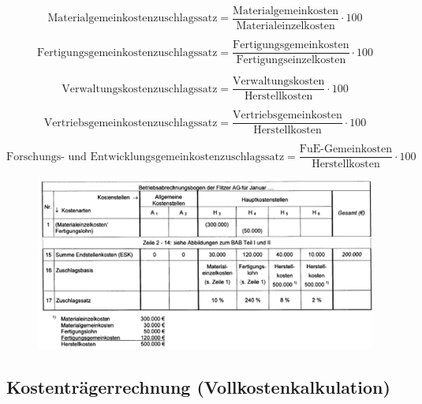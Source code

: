\documentclass[a4paper,11pt, twoside]{article}
\begin{document}
\begin{equation}
\text{Materialgemeinkostenzuschlagssatz} = \frac{\text{Materialgemeinkosten}}{\text{Materialeinzelkosten}} \cdot 100
\end{equation}

\begin{equation}
\text{Fertigungsgemeinkostenzuschlagssatz} = \frac{\text{Fertigungsgemeinkosten}}{\text{Fertigungseinzelkosten}} \cdot 100
\end{equation}

\begin{equation}
\text{Verwaltungskostenzuschlagssatz} = \frac{\text{Verwaltungskosten}}{\text{Herstellkosten}} \cdot 100
\end{equation}

\begin{equation}
\text{Vertriebsgemeinkostenzuschlagssatz} = \frac{\text{Vertriebsgemeinkosten}}{\text{Herstellkosten}} \cdot 100
\end{equation}

\begin{equation}
\text{Forschungs- und Entwicklungsgemeinkostenzuschlagssatz} = \frac{\text{FuE-Gemeinkosten}}{\text{Herstellkosten}} \cdot 100
\end{equation}

\begin{figure}[h]
 \begin{center}
   \includegraphics[scale=0.5]{bilder/zuschlagssaetze.png}
 \end{center}
\end{figure}

\newpage
\subsection{Kostenträgerrechnung (Vollkostenkalkulation)}
\end{document}
